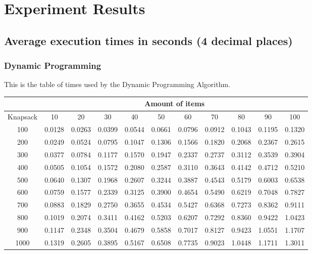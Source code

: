 \documentclass{report}
\begin{document}




\chapter*{Experiment Results}

\section*{Average execution times in seconds (4 decimal places)}

\subsection*{Dynamic Programming}

This is the table of times used by the Dynamic Programming Algorithm. 
\begin{table}[H]
\hspace{-3cm}
\begin{tabular}{|c|c|c|c|c|c|c|c|c|c|c|}
\hline
& \multicolumn{10}{c|}{Amount of items} \\
\hline
Knapsack & 10 & 20 & 30 & 40 & 50 & 60 & 70 & 80 & 90 & 100 \\
\hline
100 & 0.0128 & 0.0263 & 0.0399 & 0.0544 & 0.0661 & 0.0796 & 0.0912 & 0.1043 & 0.1195 & 0.1320\\ 
\hline
200 & 0.0249 & 0.0524 & 0.0795 & 0.1047 & 0.1306 & 0.1566 & 0.1820 & 0.2068 & 0.2367 & 0.2615\\ 
\hline
300 & 0.0377 & 0.0784 & 0.1177 & 0.1570 & 0.1947 & 0.2337 & 0.2737 & 0.3112 & 0.3539 & 0.3904\\ 
\hline
400 & 0.0505 & 0.1054 & 0.1572 & 0.2080 & 0.2587 & 0.3110 & 0.3643 & 0.4142 & 0.4712 & 0.5210\\ 
\hline
500 & 0.0640 & 0.1307 & 0.1968 & 0.2607 & 0.3244 & 0.3887 & 0.4543 & 0.5179 & 0.6003 & 0.6538\\ 
\hline
600 & 0.0759 & 0.1577 & 0.2339 & 0.3125 & 0.3900 & 0.4654 & 0.5490 & 0.6219 & 0.7048 & 0.7827\\ 
\hline
700 & 0.0883 & 0.1829 & 0.2750 & 0.3655 & 0.4534 & 0.5427 & 0.6368 & 0.7273 & 0.8362 & 0.9111\\ 
\hline
800 & 0.1019 & 0.2074 & 0.3411 & 0.4162 & 0.5203 & 0.6207 & 0.7292 & 0.8360 & 0.9422 & 1.0423\\ 
\hline
900 & 0.1147 & 0.2348 & 0.3504 & 0.4679 & 0.5858 & 0.7017 & 0.8127 & 0.9423 & 1.0551 & 1.1707\\ 
\hline
1000 & 0.1319 & 0.2605 & 0.3895 & 0.5167 & 0.6508 & 0.7735 & 0.9023 & 1.0448 & 1.1711 & 1.3011\\ 
\hline
\end{tabular}
\end{table}
\end{document}
